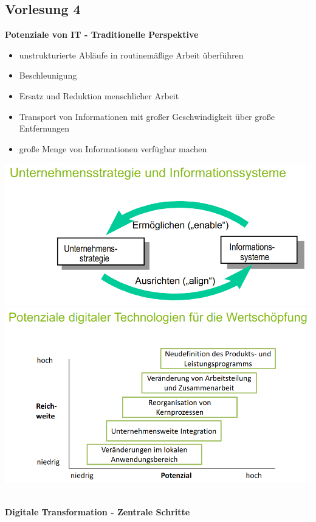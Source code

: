 \documentclass[a4]{scrartcl}
\begin{document}
\subsection*{Vorlesung 4}

\textbf{Potenziale von IT - Traditionelle Perspektive}

\begin{itemize}
\item unstrukturierte Abläufe in routinemäßige Arbeit überführen
\item Beschleunigung
\item Ersatz und Reduktion menschlicher Arbeit
\item Transport von Informationen mit großer Geschwindigkeit über große Entfernungen
\item große Menge von Informationen verfügbar machen
\end{itemize}

\includegraphics[scale=0.3]{UIS.png}
\\
\includegraphics[scale=0.3]{Potenziale.png}

\ \\

\textbf{Digitale Transformation - Zentrale Schritte}
\end{document}

